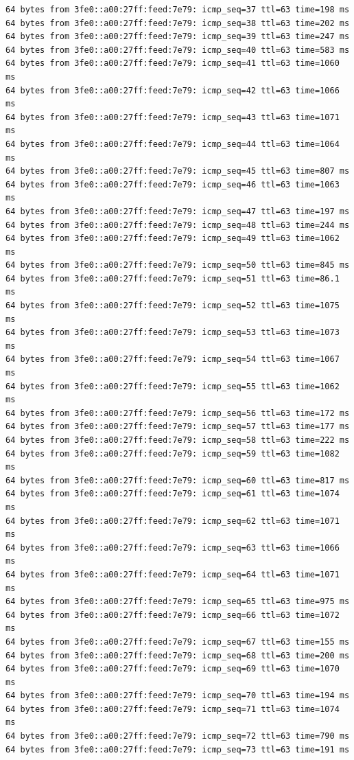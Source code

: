\documentclass{article}
\begin{document}
\begin{Verbatim}
64 bytes from 3fe0::a00:27ff:feed:7e79: icmp_seq=37 ttl=63 time=198 ms
64 bytes from 3fe0::a00:27ff:feed:7e79: icmp_seq=38 ttl=63 time=202 ms
64 bytes from 3fe0::a00:27ff:feed:7e79: icmp_seq=39 ttl=63 time=247 ms
64 bytes from 3fe0::a00:27ff:feed:7e79: icmp_seq=40 ttl=63 time=583 ms
64 bytes from 3fe0::a00:27ff:feed:7e79: icmp_seq=41 ttl=63 time=1060 ms
64 bytes from 3fe0::a00:27ff:feed:7e79: icmp_seq=42 ttl=63 time=1066 ms
64 bytes from 3fe0::a00:27ff:feed:7e79: icmp_seq=43 ttl=63 time=1071 ms
64 bytes from 3fe0::a00:27ff:feed:7e79: icmp_seq=44 ttl=63 time=1064 ms
64 bytes from 3fe0::a00:27ff:feed:7e79: icmp_seq=45 ttl=63 time=807 ms
64 bytes from 3fe0::a00:27ff:feed:7e79: icmp_seq=46 ttl=63 time=1063 ms
64 bytes from 3fe0::a00:27ff:feed:7e79: icmp_seq=47 ttl=63 time=197 ms
64 bytes from 3fe0::a00:27ff:feed:7e79: icmp_seq=48 ttl=63 time=244 ms
64 bytes from 3fe0::a00:27ff:feed:7e79: icmp_seq=49 ttl=63 time=1062 ms
64 bytes from 3fe0::a00:27ff:feed:7e79: icmp_seq=50 ttl=63 time=845 ms
64 bytes from 3fe0::a00:27ff:feed:7e79: icmp_seq=51 ttl=63 time=86.1 ms
64 bytes from 3fe0::a00:27ff:feed:7e79: icmp_seq=52 ttl=63 time=1075 ms
64 bytes from 3fe0::a00:27ff:feed:7e79: icmp_seq=53 ttl=63 time=1073 ms
64 bytes from 3fe0::a00:27ff:feed:7e79: icmp_seq=54 ttl=63 time=1067 ms
64 bytes from 3fe0::a00:27ff:feed:7e79: icmp_seq=55 ttl=63 time=1062 ms
64 bytes from 3fe0::a00:27ff:feed:7e79: icmp_seq=56 ttl=63 time=172 ms
64 bytes from 3fe0::a00:27ff:feed:7e79: icmp_seq=57 ttl=63 time=177 ms
64 bytes from 3fe0::a00:27ff:feed:7e79: icmp_seq=58 ttl=63 time=222 ms
64 bytes from 3fe0::a00:27ff:feed:7e79: icmp_seq=59 ttl=63 time=1082 ms
64 bytes from 3fe0::a00:27ff:feed:7e79: icmp_seq=60 ttl=63 time=817 ms
64 bytes from 3fe0::a00:27ff:feed:7e79: icmp_seq=61 ttl=63 time=1074 ms
64 bytes from 3fe0::a00:27ff:feed:7e79: icmp_seq=62 ttl=63 time=1071 ms
64 bytes from 3fe0::a00:27ff:feed:7e79: icmp_seq=63 ttl=63 time=1066 ms
64 bytes from 3fe0::a00:27ff:feed:7e79: icmp_seq=64 ttl=63 time=1071 ms
64 bytes from 3fe0::a00:27ff:feed:7e79: icmp_seq=65 ttl=63 time=975 ms
64 bytes from 3fe0::a00:27ff:feed:7e79: icmp_seq=66 ttl=63 time=1072 ms
64 bytes from 3fe0::a00:27ff:feed:7e79: icmp_seq=67 ttl=63 time=155 ms
64 bytes from 3fe0::a00:27ff:feed:7e79: icmp_seq=68 ttl=63 time=200 ms
64 bytes from 3fe0::a00:27ff:feed:7e79: icmp_seq=69 ttl=63 time=1070 ms
64 bytes from 3fe0::a00:27ff:feed:7e79: icmp_seq=70 ttl=63 time=194 ms
64 bytes from 3fe0::a00:27ff:feed:7e79: icmp_seq=71 ttl=63 time=1074 ms
64 bytes from 3fe0::a00:27ff:feed:7e79: icmp_seq=72 ttl=63 time=790 ms
64 bytes from 3fe0::a00:27ff:feed:7e79: icmp_seq=73 ttl=63 time=191 ms

\end{Verbatim}
\end{document}
